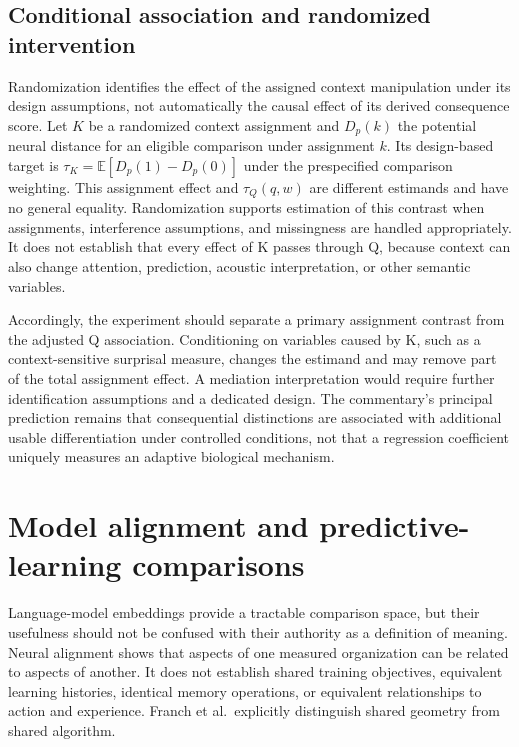 \documentclass[11pt]{article}
\begin{document}
\hypertarget{conditional-association-and-randomized-intervention}{%
\subsection{Conditional association and randomized
intervention}\label{conditional-association-and-randomized-intervention}}

Randomization identifies the effect of the assigned context manipulation
under its design assumptions, not automatically the causal effect of its
derived consequence score. Let \(K\) be a randomized context assignment
and \(D_p(k)\) the potential neural distance for an eligible comparison
under assignment \(k\). Its design-based target is
\(\tau_K=\mathbb E[D_p(1)-D_p(0)]\) under the prespecified comparison
weighting. This assignment effect and \(\tau_Q(q,w)\) are different
estimands and have no general equality. Randomization supports
estimation of this contrast when assignments, interference assumptions,
and missingness are handled appropriately. It does not establish that
every effect of K passes through Q, because context can also change
attention, prediction, acoustic interpretation, or other semantic
variables.

Accordingly, the experiment should separate a primary assignment
contrast from the adjusted Q association. Conditioning on variables
caused by K, such as a context-sensitive surprisal measure, changes the
estimand and may remove part of the total assignment effect. A mediation
interpretation would require further identification assumptions and a
dedicated design. The commentary's principal prediction remains that
consequential distinctions are associated with additional usable
differentiation under controlled conditions, not that a regression
coefficient uniquely measures an adaptive biological mechanism.

\hypertarget{model-alignment-and-predictive-learning-comparisons}{%
\section{Model alignment and predictive-learning
comparisons}\label{model-alignment-and-predictive-learning-comparisons}}

Language-model embeddings provide a tractable comparison space, but
their usefulness should not be confused with their authority as a
definition of meaning. Neural alignment shows that aspects of one
measured organization can be related to aspects of another. It does not
establish shared training objectives, equivalent learning histories,
identical memory operations, or equivalent relationships to action and
experience. Franch et al.~explicitly distinguish shared geometry from
shared algorithm.
\end{document}
